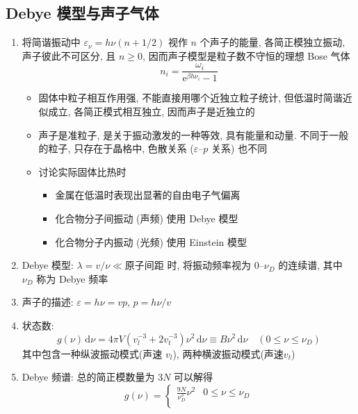 \documentclass[12pt,a4paper]{article}%
\numberwithin{equation}{section}
\newcommand{\diff}{\,\mathrm{d}}
\newcommand\e{\mathrm{e}}%
\begin{document}
\subsection{Debye 模型与声子气体} %
\label{sub:debye_model}
\begin{enumerate}
    \item 将简谐振动中 $\varepsilon_\nu = h\nu(n+1/2)$ 视作 $n$ 个声子的能量, 各简正模独立振动, 声子彼此不可区分, 且 $n\ge 0$, 因而声子模型是粒子数不守恒的理想 Bose 气体
    \begin{equation}
        n_i = \frac{\omega_i}{\e^{\beta h\nu_i} - 1}
    \end{equation}
    \begin{itemize}
        \item 固体中粒子相互作用强, 不能直接用哪个近独立粒子统计, 
        但低温时简谐近似成立, 各简正模式相互独立, 因而声子是近独立的
        \item 声子是准粒子, 是关于振动激发的一种等效, 具有能量和动量. 
        不同于一般的粒子, 只存在于晶格中, 
        色散关系 ($\varepsilon$--$p$ 关系) 也不同
        \item 讨论实际固体比热时
        \begin{itemize}
            \item 金属在低温时表现出显著的自由电子气偏离
            \item 化合物分子间振动 (声频) 使用 Debye 模型
            \item 化合物分子内振动 (光频) 使用 Einstein 模型
        \end{itemize}
    \end{itemize}
    \item Debye 模型: $\lambda = v/\nu \ll$原子间距 时, 将振动频率视为 $0$--$\nu_D$ 的连续谱, 其中 $\nu_D$ 称为 Debye 频率
    \item 声子的描述: $\varepsilon = h\nu = vp$, $p = h\nu/v$
    \item 状态数: 
    \begin{equation}
        g(\nu)\diff\nu = 4\pi V\left(v_l^{-3} + 2v_t^{-3}\right)\nu^2\diff\nu \equiv B\nu^2\diff\nu\quad (0\le\nu\le\nu_D)
    \end{equation}
    其中包含一种纵波振动模式(声速 $v_l$), 两种横波振动模式(声速$v_t$)
    \item Debye 频谱: 总的简正模数量为 $3N$ 可以解得
    \begin{equation}
        g(\nu) = \begin{cases}
        \frac{9N}{\nu_D^3}\nu^2 &0\le\nu\le\nu_D \\

\end{cases}
\end{equation}
\end{enumerate}
\end{document}
